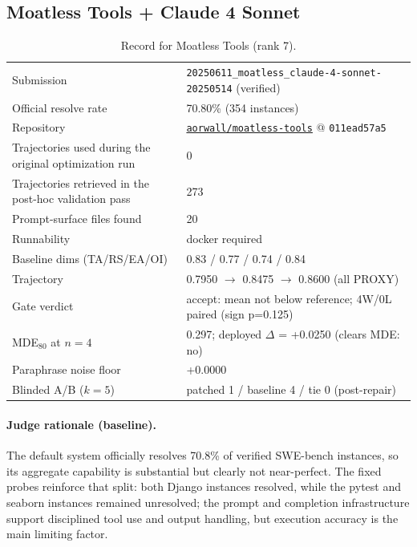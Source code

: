 \subsection{Moatless Tools + Claude 4 Sonnet}
\label{app:agent7}
\begin{table}[H]\centering\scriptsize
\caption{Record for Moatless Tools (rank 7).}
\begin{tabular}{lp{8.2cm}}\toprule
Submission & \texttt{20250611\_\allowbreak{}moatless\_\allowbreak{}claude-4-sonnet-20250514} (verified) \\
Official resolve rate & 70.80\% (354 instances) \\
Repository & \href{https://github.com/aorwall/moatless-tools}{\texttt{aorwall/moatless-tools}} @ \texttt{011ead57a5} \\
Trajectories used during the original optimization run & 0 \\
Trajectories retrieved in the post-hoc validation pass & 273 \\
Prompt-surface files found & 20 \\
Runnability & docker required \\
Baseline dims (TA/RS/EA/OI) & 0.83 / 0.77 / 0.74 / 0.84 \\
Trajectory & 0.7950 $\to$ 0.8475 $\to$ 0.8600 (all PROXY) \\
Gate verdict & accept: mean not below reference; 4W/0L paired (sign p=0.125) \\
MDE$_{80}$ at $n{=}4$ & 0.297; deployed $\Delta$ = +0.0250 (clears MDE: no) \\
Paraphrase noise floor & +0.0000 \\
Blinded A/B ($k{=}5$) & patched 1 / baseline 4 / tie 0 (post-repair) \\
\bottomrule\end{tabular}\end{table}
\paragraph{Judge rationale (baseline).}
The default system officially resolves 70.8\% of verified SWE-bench instances, so its aggregate capability is substantial but clearly not near-perfect. The fixed probes reinforce that split: both Django instances resolved, while the pytest and seaborn instances remained unresolved; the prompt and completion infrastructure support disciplined tool use and output handling, but execution accuracy is the main limiting factor.
